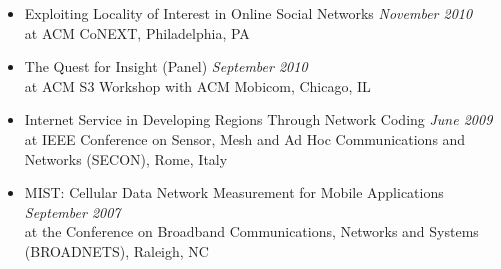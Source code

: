 \begin{itemize}
    \item Exploiting Locality of Interest in Online Social Networks
    \hfill {\it November 2010}\\
    at ACM CoNEXT, Philadelphia, PA

    \item The Quest for Insight (Panel)												\hfill {\it September 2010}\\
    at ACM S3 Workshop with ACM Mobicom, Chicago, IL

    \item Internet Service in Developing Regions Through Network Coding
    \hfill {\it June 2009}\\
    at IEEE Conference on Sensor, Mesh and Ad Hoc Communications and Networks
    (SECON), Rome, Italy

    \item MIST: Cellular Data Network Measurement for Mobile Applications
    \hfill {\it September 2007}\\
    at the Conference on Broadband Communications, Networks and Systems
    (BROADNETS), Raleigh, NC

\end{itemize}

%
%



%

